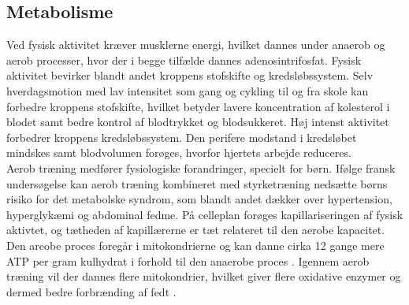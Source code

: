 \subsection{Metabolisme}
Ved fysisk aktivitet kræver musklerne energi, hvilket dannes under anaerob og aerob processer, hvor der i begge tilfælde dannes adenosintrifosfat. Fysisk aktivitet bevirker blandt andet kroppens stofskifte og kredsløbssystem. Selv hverdagsmotion med lav intensitet som gang og cykling til og fra skole kan forbedre kroppens stofskifte, hvilket betyder lavere koncentration af kolesterol i blodet samt bedre kontrol af blodtrykket og blodsukkeret. Høj intenst aktivitet forbedrer kroppens kredsløbssystem. Den perifere modstand i kredsløbet mindskes samt blodvolumen forøges, hvorfor hjertets arbejde reduceres. \citep{Kiens2007,Sundhedsstyrelsen2001} \\
Aerob træning medfører fysiologiske forandringer, specielt for børn. Ifølge fransk undersøgelse kan aerob træning kombineret med styrketræning nedsætte børns risiko for det metabolske syndrom, som blandt andet dækker over hypertension, hyperglykæmi og abdominal fedme. På celleplan forøges kapillariseringen af fysisk aktivtet, og tætheden af kapillærerne er tæt relateret til den aerobe kapacitet. \citep{Sundhedsstyrelsen2001,Guinhouya2009} Den areobe proces foregår i mitokondrierne og kan danne cirka 12 gange mere ATP per gram kulhydrat i forhold til den anaerobe proces \citep{Engelbreth2010,Stanfield2013}. Igennem aerob træning vil der dannes flere mitokondrier, hvilket giver flere oxidative enzymer og dermed bedre forbrænding af fedt \citep{Sundhedsstyrelsen2001}.